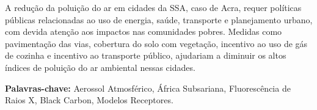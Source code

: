 
A redução da poluição do ar em cidades da SSA, caso de Acra, 
requer políticas públicas relacionadas ao uso de energia, saúde, 
transporte e planejamento urbano, com devida atenção 
aos impactos nas comunidades pobres. 
Medidas como pavimentação das vias, cobertura do solo com vegetação, 
incentivo ao uso de gás de cozinha e incentivo ao transporte público, 
ajudariam a diminuir os altos índices de poluição do ar ambiental nessas cidades.

\par
\vspace{1em}
\noindent\textbf{Palavras-chave:}  Aerossol Atmosférico, África Subsariana, Fluorescência de Raios X, Black Carbon, Modelos Receptores.
